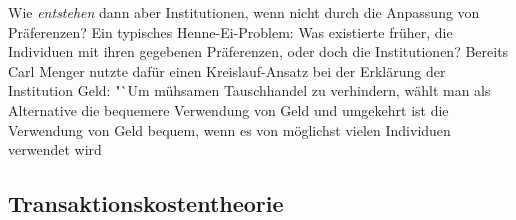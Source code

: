 Wie \textit{entstehen} dann aber Institutionen, wenn nicht durch die Anpassung von Präferenzen? Ein typisches Henne-Ei-Problem: Was existierte früher, die Individuen mit ihren gegebenen Präferenzen, oder doch die Institutionen? Bereits Carl Menger nutzte dafür einen Kreislauf-Ansatz bei der Erklärung der Institution Geld: "`Um mühsamen Tauschhandel zu verhindern, wählt man als Alternative die bequemere Verwendung von Geld und umgekehrt ist die Verwendung von Geld bequem, wenn es von möglichst vielen Individuen verwendet wird \parencite[S.176]{Hodgson1998}



\subsection{Transaktionskostentheorie}
\label{sec: Transaktionskosten}

